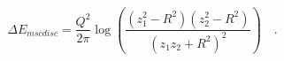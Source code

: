 \begin{equation}
\Delta E_{mscdisc} = \frac{Q^2}{2\pi} \log\left(\frac{(z_1^2-R^2)(z_2^2-R^2)}{(z_1z_2+R^2)^2}\right)\quad.
\end{equation}

